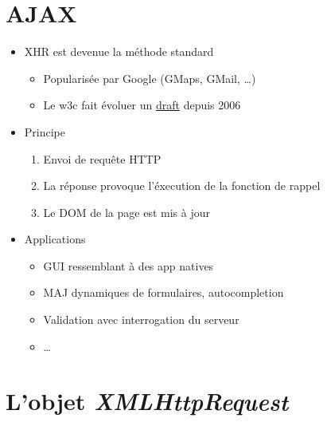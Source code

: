 \hypertarget{ajax}{%
\section{AJAX}\label{ajax}}

\begin{itemize}
\tightlist
\item
  XHR est devenue la méthode standard

  \begin{itemize}
  \tightlist
  \item
    Popularisée par Google (GMaps, GMail, \ldots{})
  \item
    Le w3c fait évoluer un
    \href{https://www.w3.org/TR/XMLHttpRequest/}{draft} depuis 2006
  \end{itemize}
\item
  Principe

  \begin{enumerate}
  \def\labelenumi{\arabic{enumi}.}
  \tightlist
  \item
    Envoi de requête HTTP
  \item
    La réponse provoque l'éxecution de la fonction de rappel
  \item
    Le DOM de la page est mis à jour
  \end{enumerate}
\item
  Applications

  \begin{itemize}
  \tightlist
  \item
    GUI ressemblant à des app natives
  \item
    MAJ dynamiques de formulaires, autocompletion
  \item
    Validation avec interrogation du serveur
  \item
    \ldots{}
  \end{itemize}
\end{itemize}

\hypertarget{lobjet-xmlhttprequest}{%
\section{\texorpdfstring{L'objet
\emph{XMLHttpRequest}}{L'objet XMLHttpRequest}}\label{lobjet-xmlhttprequest}}

